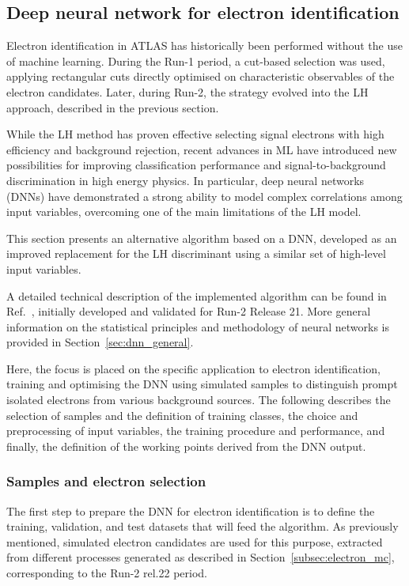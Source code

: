 \subsection{Deep neural network for electron identification}
\label{subsec:dnn_id}

Electron identification in ATLAS has historically been performed without the use of machine learning. During the Run-1 period, a cut-based selection was used, applying rectangular cuts directly optimised on characteristic observables of the electron candidates. Later, during Run-2, the strategy evolved into the LH approach, described in the previous section.

While the LH method has proven effective selecting signal electrons with high efficiency and background rejection, recent advances in ML have introduced new possibilities for improving classification performance and signal-to-background discrimination in high energy physics. In particular, deep neural networks (DNNs) have demonstrated a strong ability to model complex correlations among input variables, overcoming one of the main limitations of the LH model.

This section presents an alternative algorithm based on a DNN, developed as an improved replacement for the LH discriminant using a similar set of high-level input variables.

A detailed technical description of the implemented algorithm can be found in Ref.~\cite{dnn_paper}, initially developed and validated for Run-2 Release 21. More general information on the statistical principles and methodology of neural networks is provided in Section~\ref{sec:dnn_general}.

Here, the focus is placed on the specific application to electron identification, training and optimising the DNN using simulated samples to distinguish prompt isolated electrons from various background sources. The following describes the selection of samples and the definition of training classes, the choice and preprocessing of input variables, the training procedure and performance, and finally, the definition of the working points derived from the DNN output.

\subsubsection{Samples and electron selection}
The first step to prepare the DNN for electron identification is to define the training, validation, and test datasets that will feed the algorithm. As previously mentioned, simulated electron candidates are used for this purpose, extracted from different processes generated as described in Section~\ref{subsec:electron_mc}, corresponding to the Run-2 rel.22 period.

